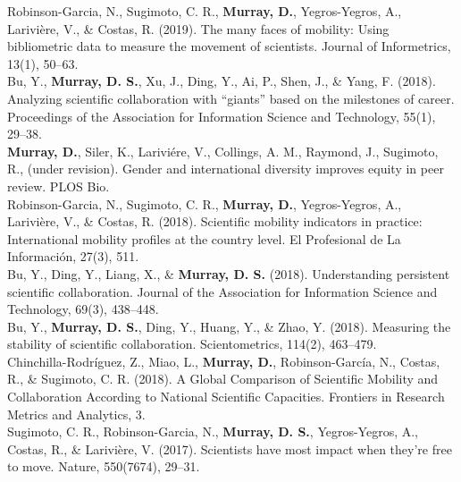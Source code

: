 \documentclass[10pt, a4paper]{article}
\newcommand{\years}[1]{\marginnote{\scriptsize #1}}
\begin{document}
\years{2019} \hangindent=0.7cm Robinson-Garcia, N., Sugimoto, C. R., \textbf{Murray, D.}, Yegros-Yegros, A., Larivière, V., \& Costas, R. (2019). The many faces of mobility: Using bibliometric data to measure the movement of scientists. Journal of Informetrics, 13(1), 50–63. \\

\years{2019} \hangindent=0.7cm Bu, Y., \textbf{Murray, D. S.}, Xu, J., Ding, Y., Ai, P., Shen, J., \& Yang, F. (2018). Analyzing scientific collaboration with “giants” based on the milestones of career. Proceedings of the Association for Information Science and Technology, 55(1), 29–38. \\

\years{2018} \hangindent=0.7cm \textbf{Murray, D.}, Siler, K., Lariviére, V., Collings, A. M., Raymond, J., Sugimoto, R., (under revision). Gender and international diversity improves equity in peer review. PLOS Bio. \\

\years{2018} \hangindent=0.7cm Robinson-Garcia, N., Sugimoto, C. R., \textbf{Murray, D.}, Yegros-Yegros, A., Larivière, V., \& Costas, R. (2018). Scientific mobility indicators in practice: International mobility profiles at the country level. El Profesional de La Información, 27(3), 511. \\

\years{2018} \hangindent=0.7cm Bu, Y., Ding, Y., Liang, X., \& \textbf{Murray, D. S. }(2018). Understanding persistent scientific collaboration. Journal of the Association for Information Science and Technology, 69(3), 438–448. \\

\years{2018} \hangindent=0.7cm Bu, Y., \textbf{Murray, D. S.}, Ding, Y., Huang, Y., \& Zhao, Y. (2018). Measuring the stability of scientific collaboration. Scientometrics, 114(2), 463–479. \\

\years{2018} \hangindent=0.7cm Chinchilla-Rodríguez, Z., Miao, L., \textbf{Murray, D.}, Robinson-García, N., Costas, R., \& Sugimoto, C. R. (2018). A Global Comparison of Scientific Mobility and Collaboration According to National Scientific Capacities. Frontiers in Research Metrics and Analytics, 3. \\

\years{2017} \hangindent=0.7cm Sugimoto, C. R., Robinson-Garcia, N., \textbf{Murray, D. S.}, Yegros-Yegros, A., Costas, R., \& Larivière, V. (2017). Scientists have most impact when they’re free to move. Nature, 550(7674), 29–31. \\
\end{document}
